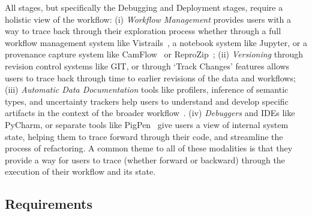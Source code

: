 %
All stages, but specifically the Debugging and Deployment stages, require a holistic view of the workflow:
(i) \textit{Workflow Management} provides users with a way to trace back through their exploration process whether through a full workflow management system like Vistrails~\cite{DBLP:conf/visualization/BavoilCSVCSF05}, a notebook system like Jupyter, or a provenance capture system like CamFlow~\cite{DBLP:conf/cloud/PasquierHGMESB17} or ReproZip~\cite{DBLP:conf/tapp/ChirigatiSF13};
(ii) \textit{Versioning} through revision control systems like GIT, or through `Track Changes' features allows users to trace back through time to earlier revisions of the data and workflows;
(iii) \textit{Automatic Data Documentation} tools like profilers,  inference of semantic types, and uncertainty trackers help users to understand and develop specific artifacts in the context of the broader workflow~\cite{kumari:2021:cidr:datasense, BS20, YM15, FH19, FH21}.
(iv) \textit{Debuggers} and IDEs like PyCharm, or separate tools like PigPen~\cite{DBLP:conf/sigmod/OlstonRSKT08} give users a view of internal system state,  %
helping them to trace forward through their code, and streamline the process of refactoring.
A common theme to all of these modalities is that they provide a way for users to trace (whether forward or backward) through the execution of their workflow and its state.

\subsection{Requirements}

\newcommand{\requirement}[2]{\begin{center}
	\vspace{-3mm}
	\begin{minipage}{0.95\textwidth}
		{\small
			\textbf{Requirement #1:} \textit{#2}
		}
	\end{minipage}
\end{center}\vspace{-2mm}}

